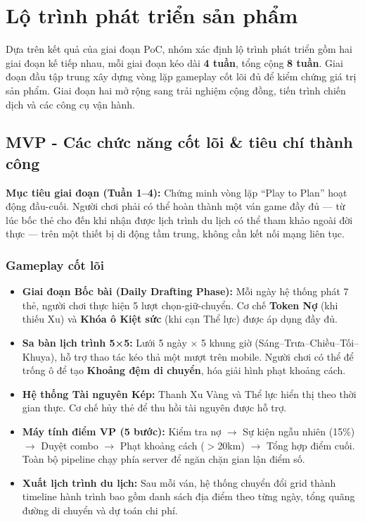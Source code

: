 \newpage

\chapter{Lộ trình phát triển sản phẩm}

Dựa trên kết quả của giai đoạn PoC, nhóm xác định lộ trình phát triển gồm hai giai đoạn kế tiếp nhau, mỗi giai đoạn kéo dài \textbf{4 tuần}, tổng cộng \textbf{8 tuần}. Giai đoạn đầu tập trung xây dựng vòng lặp gameplay cốt lõi đủ để kiểm chứng giá trị sản phẩm. Giai đoạn hai mở rộng sang trải nghiệm cộng đồng, tiến trình chiến dịch và các công cụ vận hành.

\section{MVP - Các chức năng cốt lõi \& tiêu chí thành công}

\textbf{Mục tiêu giai đoạn (Tuần 1--4):} Chứng minh vòng lặp ``Play to Plan'' hoạt động đầu-cuối. Người chơi phải có thể hoàn thành một ván game đầy đủ --- từ lúc bốc thẻ cho đến khi nhận được lịch trình du lịch có thể tham khảo ngoài đời thực --- trên một thiết bị di động tầm trung, không cần kết nối mạng liên tục.

\subsection{Gameplay cốt lõi}

\begin{itemize}[topsep=0pt, itemsep=2.5pt, leftmargin=1.5cm]
    \item \textbf{Giai đoạn Bốc bài (Daily Drafting Phase):} Mỗi ngày hệ thống phát 7 thẻ, người chơi thực hiện 5 lượt chọn-giữ-chuyển. Cơ chế \textbf{Token Nợ} (khi thiếu Xu) và \textbf{Khóa ô Kiệt sức} (khi cạn Thể lực) được áp dụng đầy đủ.

    \item \textbf{Sa bàn lịch trình 5×5:} Lưới 5 ngày × 5 khung giờ (Sáng–Trưa–Chiều–Tối–Khuya), hỗ trợ thao tác kéo thả một mượt trên mobile. Người chơi có thể để trống ô để tạo \textbf{Khoảng đệm di chuyển}, hóa giải hình phạt khoảng cách.

    \item \textbf{Hệ thống Tài nguyên Kép:} Thanh Xu Vàng và Thể lực hiển thị theo thời gian thực. Cơ chế hủy thẻ để thu hồi tài nguyên được hỗ trợ.

    \item \textbf{Máy tính điểm VP (5 bước):} Kiểm tra nợ $\rightarrow$ Sự kiện ngẫu nhiên (15\%) $\rightarrow$ Duyệt combo $\rightarrow$ Phạt khoảng cách ($>$20km) $\rightarrow$ Tổng hợp điểm cuối. Toàn bộ pipeline chạy phía server để ngăn chặn gian lận điểm số.

    \item \textbf{Xuất lịch trình du lịch:} Sau mỗi ván, hệ thống chuyển đổi grid thành timeline hành trình bao gồm danh sách địa điểm theo từng ngày, tổng quãng đường di chuyển và dự toán chi phí.
\end{itemize}

